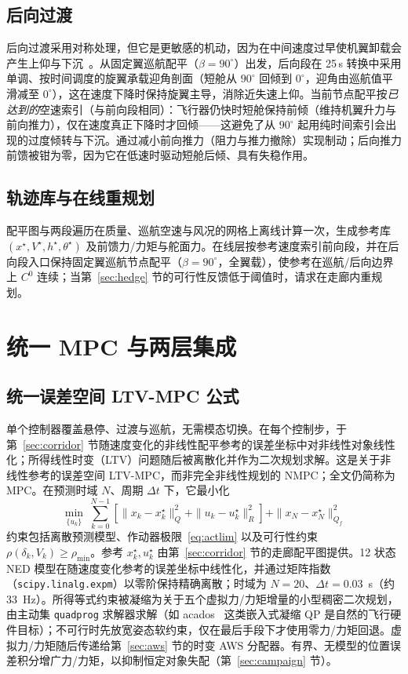\documentclass[UTF8,a4paper,11pt]{ctexart}
\begin{document}
\subsection{后向过渡}\label{sec:backward}
后向过渡采用对称处理，但它是更敏感的机动，因为在中间速度过早使机翼卸载会产生上仰与下沉~\cite{may2025backward}。从固定翼巡航配平（$\beta=90^\circ$）出发，后向段在 25\,s 转换中采用单调、按时间调度的旋翼承载迎角剖面（短舱从 $90^\circ$ 回倾到 $0^\circ$，迎角由巡航值平滑减至 $0^\circ$），这在速度下降时保持旋翼主导，消除近失速上仰。当前节点配平按\emph{已达到的}空速索引（与前向段相同）：飞行器仍快时短舱保持前倾（维持机翼升力与前向推力），仅在速度真正下降时才回倾——这避免了从 $90^\circ$ 起用纯时间索引会出现的过度倾转与下沉。通过减小前向推力（阻力与推力撤除）实现制动；后向推力前馈被钳为零，因为它在低速时驱动短舱后倾、具有失稳作用。

\subsection{轨迹库与在线重规划}\label{sec:library}
配平图与两段遍历在质量、巡航空速与风况的网格上离线计算一次，生成参考库 $(x^\star,V^\star,h^\star,\theta^\star)$ 及前馈力/力矩与舵面力。在线层按参考速度索引前向段，并在后向段入口保持固定翼巡航节点配平（$\beta=90^\circ$，全翼载），使参考在巡航/后向边界上 $C^0$ 连续；当第~\ref{sec:hedge} 节的可行性反馈低于阈值时，请求在走廊内重规划。

\section{统一 MPC 与两层集成}\label{sec:nmpc}

\subsection{统一误差空间 LTV-MPC 公式}\label{sec:nmpcform}
单个控制器覆盖悬停、过渡与巡航，无需模态切换。在每个控制步，于第~\ref{sec:corridor} 节随速度变化的非线性配平参考的误差坐标中对非线性对象线性化；所得线性时变（LTV）问题随后被离散化并作为二次规划求解。这是关于非线性参考的误差空间 LTV-MPC，而非完全非线性规划的 NMPC；全文仍简称为 MPC。在预测时域 $N$、周期 $\Delta t$ 下，它最小化
\begin{equation}
\min_{\{u_k\}}\ \sum_{k=0}^{N-1}
\!\left[\|x_k-x_k^\star\|_{Q}^{2}+\|u_k-u_k^\star\|_{R}^{2}\right]
+\|x_N-x_N^\star\|_{Q_f}^{2}
\label{eq:nmpc}
\end{equation}
约束包括离散预测模型、作动器极限~\eqref{eq:actlim} 以及可行性约束 $\rho(\delta_k,V_k)\ge\rho_{\min}$。参考 $x_k^\star,u_k^\star$ 由第~\ref{sec:corridor} 节的走廊配平图提供。12 状态 NED 模型在随速度变化参考的误差坐标中线性化，并通过矩阵指数（\texttt{scipy.linalg.expm}）以零阶保持精确离散；时域为 $N=20$、$\Delta t=0.03$~s（约 33~Hz）。所得等式约束被凝缩为关于五个虚拟力/力矩增量的小型稠密二次规划，由主动集 \texttt{quadprog} 求解器求解（如 acados~\cite{verschueren2022acados} 这类嵌入式凝缩 QP 是自然的飞行硬件目标）；不可行时先放宽姿态软约束，仅在最后手段下才使用零力/力矩回退。虚拟力/力矩随后传递给第~\ref{sec:aws} 节的时变 AWS 分配器。有界、无模型的位置误差积分增广力/力矩，以抑制恒定对象失配（第~\ref{sec:campaign} 节）。
\end{document}
